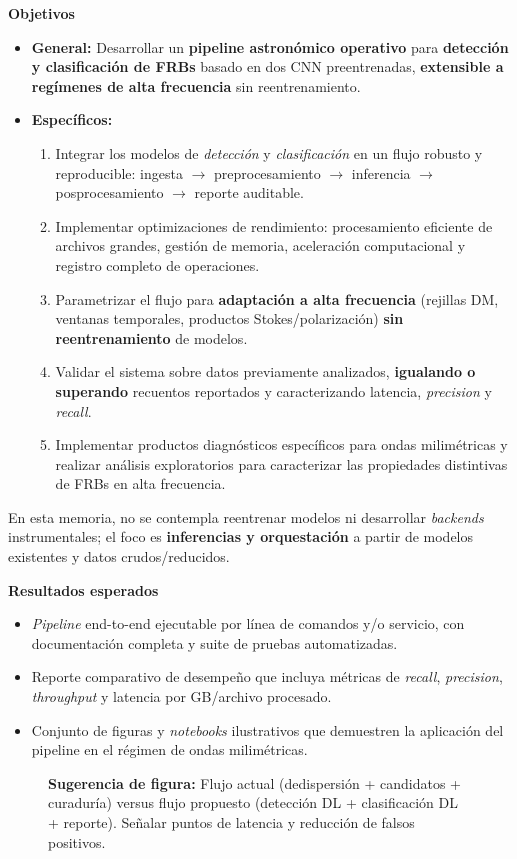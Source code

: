 \textbf{Objetivos}
\begin{itemize}
\item \textbf{General:} Desarrollar un \textbf{pipeline astronómico operativo} para \textbf{detección y clasificación de FRBs} basado en dos CNN preentrenadas, \textbf{extensible a regímenes de alta frecuencia} sin reentrenamiento.
\item \textbf{Específicos:}
\begin{enumerate}
\item Integrar los modelos de \emph{detección} y \emph{clasificación} en un flujo robusto y reproducible: ingesta $\to$ preprocesamiento $\to$ inferencia $\to$ posprocesamiento $\to$ reporte auditable.
\item Implementar optimizaciones de rendimiento: procesamiento eficiente de archivos grandes, gestión de memoria, aceleración computacional y registro completo de operaciones.
\item Parametrizar el flujo para \textbf{adaptación a alta frecuencia} (rejillas DM, ventanas temporales, productos Stokes/polarización) \textbf{sin reentrenamiento} de modelos.
\item Validar el sistema sobre datos previamente analizados, \textbf{igualando o superando} recuentos reportados y caracterizando latencia, \emph{precision} y \emph{recall}.
\item Implementar productos diagnósticos específicos para ondas milimétricas y realizar análisis exploratorios para caracterizar las propiedades distintivas de FRBs en alta frecuencia.
\end{enumerate}
\end{itemize}

\medskip
En esta memoria, no se contempla reentrenar modelos ni desarrollar \emph{backends} instrumentales; el foco es \textbf{inferencias y orquestación} a partir de modelos existentes y datos crudos/reducidos.

\medskip
\noindent\textbf{Resultados esperados}
\begin{itemize}
\item \emph{Pipeline} end-to-end ejecutable por línea de comandos y/o servicio, con documentación completa y suite de pruebas automatizadas.
\item Reporte comparativo de desempeño que incluya métricas de \emph{recall}, \emph{precision}, \emph{throughput} y latencia por GB/archivo procesado.
\item Conjunto de figuras y \emph{notebooks} ilustrativos que demuestren la aplicación del pipeline en el régimen de ondas milimétricas.
\end{itemize}

\begin{figure}[h]
\centering
\caption{\textbf{Sugerencia de figura:} Flujo actual (dedispersión + candidatos + curaduría) versus flujo propuesto (detección DL + clasificación DL + reporte). Señalar puntos de latencia y reducción de falsos positivos.}
\end{figure}

\newpage